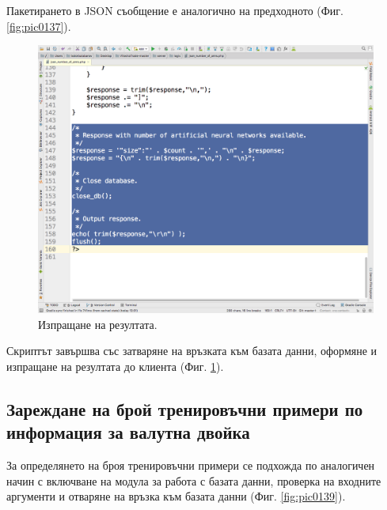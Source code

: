 \documentclass[book,14pt,oneside,openany]{memoir}
\begin{document}
Пакетирането в JSON съобщение е аналогично на предходното (Фиг. \ref{fig:pic0137}).

\begin{figure}[h]
  \centering
  \includegraphics[height=0.45\pdfpageheight]{pic0138}
  \caption{Изпращане на резултата.}
\label{fig:pic0138}
\end{figure}
\FloatBarrier

Скриптът завършва със затваряне на връзката към базата данни, оформяне и изпращане на резултата до клиента (Фиг. \ref{fig:pic0138}).

\subsection{Зареждане на брой тренировъчни примери по информация за валутна двойка}

За определянето на броя тренировъчни примери се подхожда по аналогичен начин с включване на модула за работа с базата данни, проверка на входните аргументи и отваряне на връзка към базата данни (Фиг. \ref{fig:pic0139}). 
\end{document}

